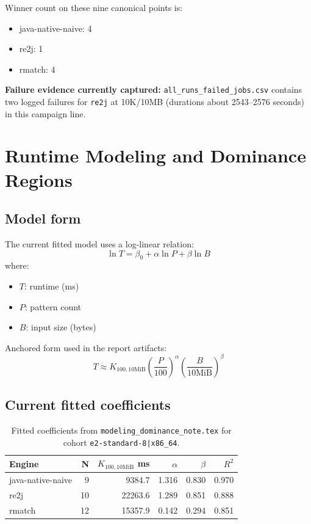 \documentclass[11pt]{article}
\begin{document}
Winner count on these nine canonical points is:
\begin{itemize}
  \item java-native-naive: 4
  \item re2j: 1
  \item rmatch: 4
\end{itemize}

\textbf{Failure evidence currently captured:} \texttt{all\_runs\_failed\_jobs.csv} contains two logged failures for \texttt{re2j} at 10K/10MB (durations about 2543--2576 seconds) in this campaign line.

\section{Runtime Modeling and Dominance Regions}
\subsection{Model form}
The current fitted model uses a log-linear relation:
\[
\ln T = \beta_0 + \alpha \ln P + \beta \ln B
\]
where:
\begin{itemize}
  \item \(T\): runtime (ms)
  \item \(P\): pattern count
  \item \(B\): input size (bytes)
\end{itemize}

Anchored form used in the report artifacts:
\[
T \approx K_{100,10\text{MiB}}\left(\frac{P}{100}\right)^{\alpha}\left(\frac{B}{10\text{MiB}}\right)^{\beta}
\]

\subsection{Current fitted coefficients}
\begin{table}[h!]
\centering
\small
\begin{tabular}{lrrrrr}
\toprule
Engine & N & \(K_{100,10\text{MiB}}\) ms & \(\alpha\) & \(\beta\) & \(R^2\) \\
\midrule
java-native-naive & 9  & 9384.7  & 1.316 & 0.830 & 0.970 \\
re2j              & 10 & 22263.6 & 1.289 & 0.851 & 0.888 \\
rmatch            & 12 & 15357.9 & 0.142 & 0.294 & 0.851 \\
\bottomrule
\end{tabular}
\caption{Fitted coefficients from \texttt{modeling\_dominance\_note.tex} for cohort \texttt{e2-standard-8|x86\_64}.}
\end{table}
\end{document}
